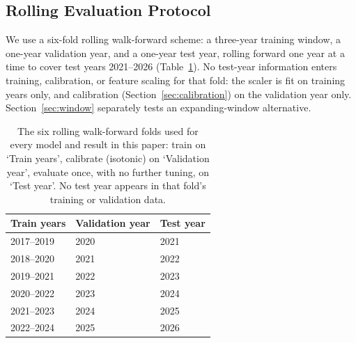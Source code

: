 \documentclass[sigconf,review]{acmart}
\begin{document}
\subsection{Rolling Evaluation Protocol}
We use a six-fold rolling walk-forward scheme: a three-year training window, a one-year validation year, and a one-year test year, rolling forward one year at a time to cover test years 2021--2026 (Table~\ref{tab:folds}). No test-year information enters training, calibration, or feature scaling for that fold: the scaler is fit on training years only, and calibration (Section~\ref{sec:calibration}) on the validation year only. Section~\ref{sec:window} separately tests an expanding-window alternative.

\begin{table}[H]
\centering
\footnotesize
\begin{tabular}{lll}
\toprule
Train years & Validation year & Test year \\
\midrule
2017--2019 & 2020 & 2021 \\
2018--2020 & 2021 & 2022 \\
2019--2021 & 2022 & 2023 \\
2020--2022 & 2023 & 2024 \\
2021--2023 & 2024 & 2025 \\
2022--2024 & 2025 & 2026 \\
\bottomrule
\end{tabular}
\caption{The six rolling walk-forward folds used for every model and result in this paper: train on `Train years', calibrate (isotonic) on `Validation year', evaluate once, with no further tuning, on `Test year'. No test year appears in that fold's training or validation data.}
\label{tab:folds}
\end{table}
\end{document}
